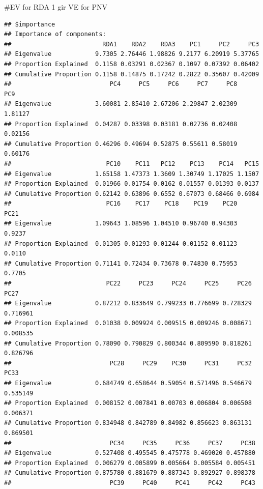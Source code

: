 \documentclass[]{article}
\newenvironment{Shaded}{\begin{snugshade}}{\end{snugshade}}
\newcommand{\KeywordTok}[1]{\textcolor[rgb]{0.13,0.29,0.53}{\textbf{#1}}}
\newcommand{\NormalTok}[1]{#1}
\newcommand{\OperatorTok}[1]{\textcolor[rgb]{0.81,0.36,0.00}{\textbf{#1}}}
\begin{document}
\#EV for RDA 1 gir VE for PNV

\begin{Shaded}
\end{Shaded}

\begin{verbatim}
## $importance
## Importance of components:
##                         RDA1    RDA2    RDA3    PC1     PC2     PC3
## Eigenvalue            9.7305 2.76446 1.98826 9.2177 6.20919 5.37765
## Proportion Explained  0.1158 0.03291 0.02367 0.1097 0.07392 0.06402
## Cumulative Proportion 0.1158 0.14875 0.17242 0.2822 0.35607 0.42009
##                           PC4     PC5     PC6     PC7     PC8     PC9
## Eigenvalue            3.60081 2.85410 2.67206 2.29847 2.02309 1.81127
## Proportion Explained  0.04287 0.03398 0.03181 0.02736 0.02408 0.02156
## Cumulative Proportion 0.46296 0.49694 0.52875 0.55611 0.58019 0.60176
##                          PC10    PC11   PC12    PC13    PC14   PC15
## Eigenvalue            1.65158 1.47373 1.3609 1.30749 1.17025 1.1507
## Proportion Explained  0.01966 0.01754 0.0162 0.01557 0.01393 0.0137
## Cumulative Proportion 0.62142 0.63896 0.6552 0.67073 0.68466 0.6984
##                          PC16    PC17    PC18    PC19    PC20   PC21
## Eigenvalue            1.09643 1.08596 1.04510 0.96740 0.94303 0.9237
## Proportion Explained  0.01305 0.01293 0.01244 0.01152 0.01123 0.0110
## Cumulative Proportion 0.71141 0.72434 0.73678 0.74830 0.75953 0.7705
##                          PC22     PC23     PC24     PC25     PC26     PC27
## Eigenvalue            0.87212 0.833649 0.799233 0.776699 0.728329 0.716961
## Proportion Explained  0.01038 0.009924 0.009515 0.009246 0.008671 0.008535
## Cumulative Proportion 0.78090 0.790829 0.800344 0.809590 0.818261 0.826796
##                           PC28     PC29    PC30     PC31     PC32     PC33
## Eigenvalue            0.684749 0.658644 0.59054 0.571496 0.546679 0.535149
## Proportion Explained  0.008152 0.007841 0.00703 0.006804 0.006508 0.006371
## Cumulative Proportion 0.834948 0.842789 0.84982 0.856623 0.863131 0.869501
##                           PC34     PC35     PC36     PC37     PC38
## Eigenvalue            0.527408 0.495545 0.475778 0.469020 0.457880
## Proportion Explained  0.006279 0.005899 0.005664 0.005584 0.005451
## Cumulative Proportion 0.875780 0.881679 0.887343 0.892927 0.898378
##                           PC39     PC40     PC41     PC42     PC43

\end{verbatim}
\end{document}
